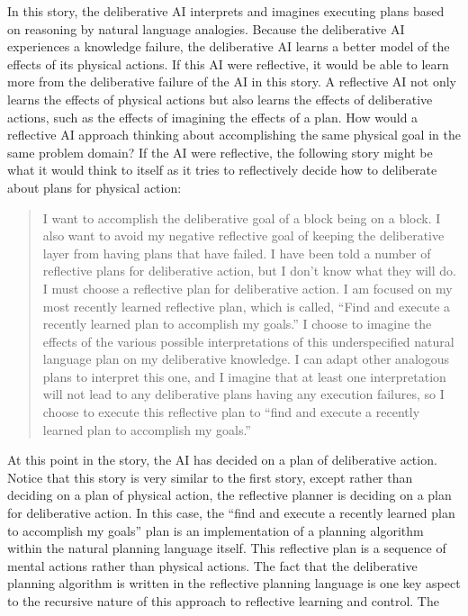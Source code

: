 In this story, the deliberative AI interprets and imagines executing
plans based on reasoning by natural language analogies.  Because the
deliberative AI experiences a knowledge failure, the deliberative AI
learns a better model of the effects of its physical actions.  If this
AI were reflective, it would be able to learn more from the
deliberative failure of the AI in this story.  A reflective AI not
only learns the effects of physical actions but also learns the
effects of deliberative actions, such as the effects of imagining the
effects of a plan.  How would a reflective AI approach thinking about
accomplishing the same physical goal in the same problem domain?  If
the AI were reflective, the following story might be what it would
think to itself as it tries to reflectively decide how to deliberate
about plans for physical action:
\begin{quote}
  I want to accomplish the deliberative goal of a block being on a
  block.  I also want to avoid my negative reflective goal of keeping
  the deliberative layer from having plans that have failed.  I have
  been told a number of reflective plans for deliberative action, but
  I don't know what they will do.  I must choose a reflective plan for
  deliberative action.  I am focused on my most recently learned
  reflective plan, which is called, ``Find and execute a recently
  learned plan to accomplish my goals.''  I choose to imagine the
  effects of the various possible interpretations of this
  underspecified natural language plan on my deliberative knowledge.
  I can adapt other analogous plans to interpret this one, and I
  imagine that at least one interpretation will not lead to any
  deliberative plans having any execution failures, so I choose to
  execute this reflective plan to ``find and execute a recently
  learned plan to accomplish my goals.''
\end{quote}
At this point in the story, the AI has decided on a plan of
deliberative action.  Notice that this story is very similar to the
first story, except rather than deciding on a plan of physical action,
the reflective planner is deciding on a plan for deliberative action.
In this case, the ``find and execute a recently learned plan to
accomplish my goals'' plan is an implementation of a planning
algorithm within the natural planning language itself.  This
reflective plan is a sequence of mental actions rather than physical
actions.  The fact that the deliberative planning algorithm is written
in the reflective planning language is one key aspect to the recursive
nature of this approach to reflective learning and control.  The
